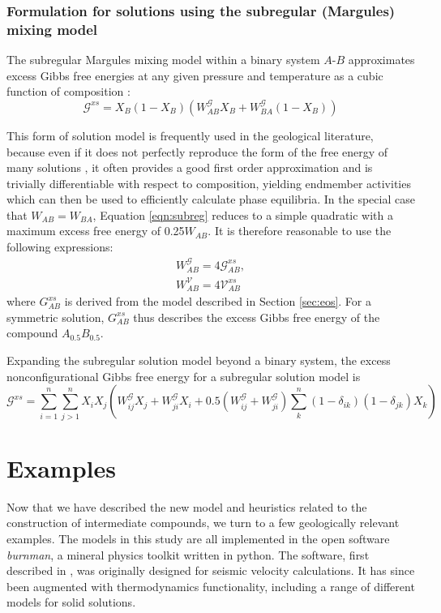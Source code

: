 \subsubsection{Formulation for solutions using the subregular (Margules) mixing model}

The subregular Margules mixing model within a binary system $A$-$B$ approximates excess Gibbs free energies at any given pressure and temperature as a cubic function of composition \citep{HW1989}:
\begin{equation}
  \mathcal{G}^{xs} = X_B (1-X_B) \left(W^{\mathcal{G}}_{AB} X_B + W^{\mathcal{G}}_{BA} (1-X_B) \right)
  \label{eqn:subreg}
\end{equation}

This form of solution model is frequently used in the geological literature, because even if it does not perfectly reproduce the form of the free energy of many solutions \citep{NW1980}, it often provides a good first order approximation and is trivially differentiable with respect to composition, yielding endmember activities which can then be used to efficiently calculate phase equilibria. In the special case that $W_{AB} = W_{BA}$, Equation \ref{eqn:subreg} reduces to a simple quadratic with a maximum excess free energy of 0.25$W_{AB}$. It is therefore reasonable to use the following expressions:
\begin{eqnarray}
W^{\mathcal{G}}_{AB} = 4 \mathcal{G}^{xs}_{AB},\\
W^{\mathcal{V}}_{AB} = 4 \mathcal{V}^{xs}_{AB}
\end{eqnarray}
\noindent where $G^{xs}_{AB}$ is derived from the model described in Section \ref{sec:eos}. For a symmetric solution, $G^{xs}_{AB}$ thus describes the excess Gibbs free energy of the compound $A_{0.5}B_{0.5}$.


Expanding the subregular solution model beyond a binary system, the excess nonconfigurational Gibbs free energy for a subregular solution model is \citep{HW1989} 
\begin{equation}
  \mathcal{G}^{xs} = \sum_{i=1}^n \sum_{j>1}^n X_i X_j \left ( W^{\mathcal{G}}_{ij} X_j + W^{\mathcal{G}}_{ji} X_i + 0.5 (W^{\mathcal{G}}_{ij} + W^{\mathcal{G}}_{ji}) \sum_k^n (1-\delta_{ik})(1-\delta_{jk}) X_k \right)
  \label{xs}
\end{equation}

\section{Examples}
Now that we have described the new model and heuristics related to the construction of intermediate compounds, we turn to a few geologically relevant examples. The models in this study are all implemented in the open software \emph{burnman}, a mineral physics toolkit written in python. The software, first described in \cite{CHRU2014}, was originally designed for seismic velocity calculations. It has since been augmented with thermodynamics functionality, including a range of different models for solid solutions.


